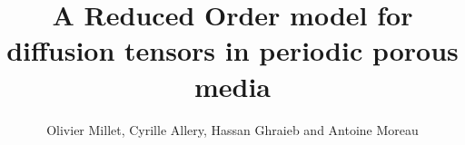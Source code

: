 \documentclass[a4paper,10pt]{article}
\title{A Reduced Order model for diffusion tensors in periodic porous media}
\author{Olivier Millet, Cyrille Allery, Hassan Ghraieb and Antoine Moreau}
\begin{document}


\maketitle

\begin{abstract}

\end{abstract}

%


%


%


%



%



\end{document}
